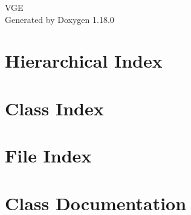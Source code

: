 \documentclass[twoside]{book}
\newcommand{\+}{\discretionary{\mbox{\scriptsize$\hookleftarrow$}}{}{}}
\newcommand{\clearemptydoublepage}{%
    \newpage{\pagestyle{empty}\cleardoublepage}%
  }
\begin{document}
  \raggedbottom
    \hypersetup{pageanchor=false,
                bookmarksnumbered=true,
                pdfencoding=unicode
               }
  \begin{titlepage}
  \vspace*{7cm}
  \begin{center}%
  {\Large VGE}\\
  \vspace*{1cm}
  {\large Generated by Doxygen 1.18.0}\\
  \end{center}
  \end{titlepage}
  \clearemptydoublepage
  \tableofcontents
  \clearemptydoublepage
  \hypersetup{pageanchor=true}
\chapter{Hierarchical Index}

\chapter{Class Index}

\chapter{File Index}

\chapter{Class Documentation}





































\end{document}
